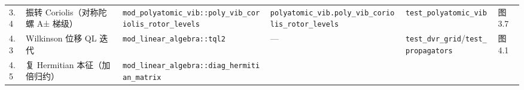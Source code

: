 \documentclass[
]{ctexbook}
\begin{document}
\begin{longtable}[]{@{}llllll@{}}
\begin{minipage}[t]{0.14\columnwidth}
3.4\strut
\end{minipage} & \begin{minipage}[t]{0.14\columnwidth}\raggedright
振转 Coriolis（对称陀螺 A± 梯级）\strut
\end{minipage} & \begin{minipage}[t]{0.14\columnwidth}\raggedright
\texttt{mod\_polyatomic\_vib::poly\_vib\_coriolis\_rotor\_levels}\strut
\end{minipage} & \begin{minipage}[t]{0.14\columnwidth}\raggedright
\texttt{polyatomic\_vib.poly\_vib\_coriolis\_rotor\_levels}\strut
\end{minipage} & \begin{minipage}[t]{0.14\columnwidth}\raggedright
\texttt{test\_polyatomic\_vib}\strut
\end{minipage} & \begin{minipage}[t]{0.14\columnwidth}\raggedright
图 3.7\strut
\end{minipage}\tabularnewline
\begin{minipage}[t]{0.14\columnwidth}\raggedright
4.3\strut
\end{minipage} & \begin{minipage}[t]{0.14\columnwidth}\raggedright
Wilkinson 位移 QL 迭代\strut
\end{minipage} & \begin{minipage}[t]{0.14\columnwidth}\raggedright
\texttt{mod\_linear\_algebra::tql2}\strut
\end{minipage} & \begin{minipage}[t]{0.14\columnwidth}\raggedright
---\strut
\end{minipage} & \begin{minipage}[t]{0.14\columnwidth}\raggedright
\texttt{test\_dvr\_grid}/\texttt{test\_propagators}\strut
\end{minipage} & \begin{minipage}[t]{0.14\columnwidth}\raggedright
图 4.1\strut
\end{minipage}\tabularnewline
\begin{minipage}[t]{0.14\columnwidth}\raggedright
4.5\strut
\end{minipage} & \begin{minipage}[t]{0.14\columnwidth}\raggedright
复 Hermitian 本征（加倍归约）\strut
\end{minipage} & \begin{minipage}[t]{0.14\columnwidth}\raggedright
\texttt{mod\_linear\_algebra::diag\_hermitian\_matrix}\strut
\end{minipage} & \begin{minipage}[t]{0.14\columnwidth}\raggedright

\end{minipage}
\end{longtable}
\end{document}
